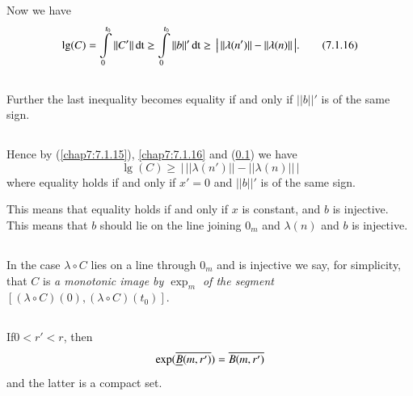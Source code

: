 Now we have
\begin{equation*}
\lg(C)=\int\limits^{t_{0}}_{0}||C'||\operatorname{dt}\geq
\int\limits^{t_{0}}_{0}||b||'\operatorname{dt}\geq \,\big|\, ||\lambda(n')||-||\lambda(n)||\,\big|.\tag{7.1.16}\label{chap7:7.1.16}
\end{equation*}

\setcounter{subsection}{16}
\subsection{}\label{chap7:7.1.17}
Further the last inequality becomes equality if and only if $||b||'$
is of the same sign.

\subsection{}\label{chap7:7.1.18}
Hence by (\ref{chap7:7.1.15}), \eqref{chap7:7.1.16} and (\ref{chap7:7.1.17}) we have
$$
\lg(C)\geq \,\big|\,||\lambda(n')||-||\lambda(n)||\,\big|
$$
where equality holds if and only if $x'=0$ and $||b||'$ is of the same
sign.

This means that equality holds if and only if $x$ is constant, and $b$
is injective. This means that $b$ should lie on the line joining
$0_{m}$ and $\lambda(n)$ and $b$ is injective.

\setcounter{subsection}{18}

\subsection{}\label{chap7:note7.1.19}

\begin{note*}
In the case $\lambda\circ C$ lies on a line through $0_{m}$ and is
injective we say, for simplicity, that $C$ is {\em a monotonic image
  by $\exp_{m}$ of the segment} $[(\lambda\circ C)(0),(\lambda\circ
  C)(t_{0})]$. 
\end{note*}

\setcounter{subsection}{19}

\subsection{}\label{chap7:7.1.20}

\begin{lemma*}
If\pageoriginale $0<r'<r$, then
$$
\exp(\overline{\underline{B}(m,r')})=\overline{B(m,r')}
$$
and the latter is a compact set.
\end{lemma*}

